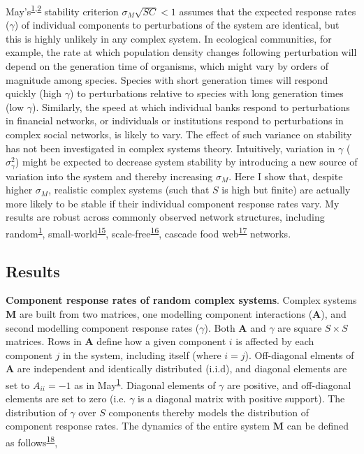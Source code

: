 \documentclass[]{article}
\begin{document}
May's\textsuperscript{\protect\hyperlink{ref-May1972}{1},\protect\hyperlink{ref-Allesina2012}{2}}
stability criterion \(\sigma_{M}\sqrt{SC} < 1\) assumes that the
expected response rates (\(\gamma\)) of individual components to
perturbations of the system are identical, but this is highly unlikely
in any complex system. In ecological communities, for example, the rate
at which population density changes following perturbation will depend
on the generation time of organisms, which might vary by orders of
magnitude among species. Species with short generation times will
respond quickly (high \(\gamma\)) to perturbations relative to species
with long generation times (low \(\gamma\)). Similarly, the speed at
which individual banks respond to perturbations in financial networks,
or individuals or institutions respond to perturbations in complex
social networks, is likely to vary. The effect of such variance on
stability has not been investigated in complex systems theory.
Intuitively, variation in \(\gamma\) (\(\sigma^{2}_{\gamma}\)) might be
expected to decrease system stability by introducing a new source of
variation into the system and thereby increasing \(\sigma_{M}\). Here I
show that, despite higher \(\sigma_{M}\), realistic complex systems
(such that \(S\) is high but finite) are actually more likely to be
stable if their individual component response rates vary. My results are
robust across commonly observed network structures, including
random\textsuperscript{\protect\hyperlink{ref-May1972}{1}},
small-world\textsuperscript{\protect\hyperlink{ref-Watts1998}{15}},
scale-free\textsuperscript{\protect\hyperlink{ref-Albert2002}{16}},
cascade food
web\textsuperscript{\protect\hyperlink{ref-Williams2000}{17}} networks.

\subsection{Results}\label{results}

\textbf{Component response rates of random complex systems}. Complex
systems \(\mathbf{M}\) are built from two matrices, one modelling
component interactions (\(\mathbf{A}\)), and second modelling component
response rates (\(\gamma\)). Both \(\mathbf{A}\) and \(\gamma\) are
square \(S \times S\) matrices. Rows in \(\mathbf{A}\) define how a
given component \(i\) is affected by each component \(j\) in the system,
including itself (where \(i = j\)). Off-diagonal elments of
\(\mathbf{A}\) are independent and identically distributed (i.i.d), and
diagonal elements are set to \(A_{ii} = -1\) as in
May\textsuperscript{\protect\hyperlink{ref-May1972}{1}}. Diagonal
elements of \(\gamma\) are positive, and off-diagonal elements are set
to zero (i.e. \(\gamma\) is a diagonal matrix with positive support).
The distribution of \(\gamma\) over \(S\) components thereby models the
distribution of component response rates. The dynamics of the entire
system \(\mathbf{M}\) can be defined as
follows\textsuperscript{\protect\hyperlink{ref-Patel2018}{18}},
\end{document}

